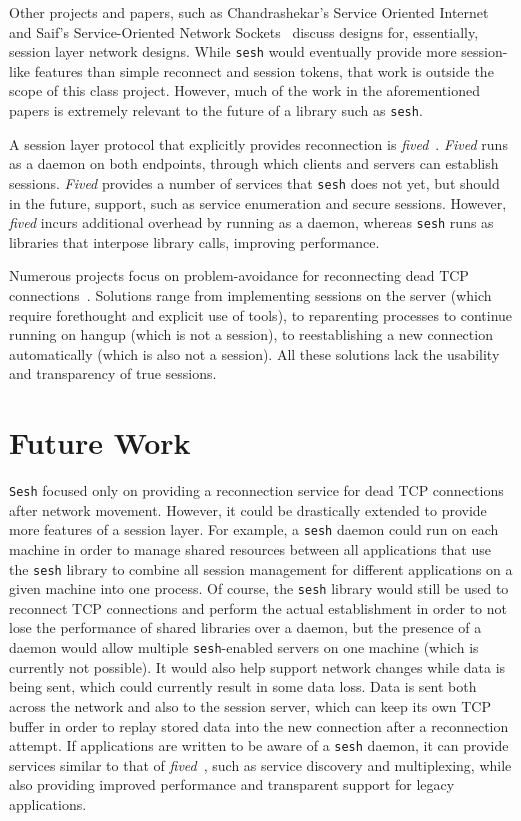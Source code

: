 \documentclass[twocolumn,11pt]{article}
\newcommand{\sesh}{\texttt{sesh}\xspace}
\newcommand{\Sesh}{\texttt{Sesh}\xspace}
\begin{document}
Other projects and papers, such as Chandrashekar's Service Oriented
Internet~\cite{chandrashekar2003service} and Saif's Service-Oriented Network
Sockets~\cite{Saif} discuss designs for, essentially, session layer network designs.
While \sesh would eventually provide more session-like features than
simple reconnect and session tokens, that work is outside the scope of this class
project. However, much of the work in the aforementioned papers is extremely
relevant to the future of a library such as \sesh.

A session layer protocol that explicitly provides reconnection is
\textit{fived}~\cite{wasptr-15-01}. \textit{Fived} runs as a daemon on both
endpoints, through which clients and servers can establish sessions.
\textit{Fived} provides a number of services that \sesh does not yet,
but should in the future, support, such as service enumeration and secure
sessions. However,
\textit{fived} incurs additional overhead by running as a daemon, whereas
\sesh runs as libraries that interpose library calls, improving
performance.

Numerous projects focus on problem-avoidance for reconnecting dead TCP
connections~\cite{mosh,autossh,screen,tmux}. Solutions range from implementing
sessions on the server (which require forethought and explicit use of tools), to
reparenting processes to continue running on hangup (which is not a session), to
reestablishing a new connection automatically (which is also not a session). All
these solutions lack the usability and transparency of true sessions.

\section{Future Work}

\Sesh focused only on providing a reconnection service for dead TCP connections
after network movement. However, it could be drastically extended to provide
more features of a session layer. For example, a \sesh daemon could run on each
machine in order to manage shared resources between all applications that use
the \sesh library to combine all session management for different applications
on a given machine into one process. Of course, the \sesh library would still be
used to reconnect TCP connections and perform the actual establishment in order
to not lose the performance of shared libraries over a daemon, but the presence
of a daemon would allow multiple \sesh-enabled servers on one machine (which is
currently not possible). It would also help support network changes while data
is being sent, which could currently result in some data loss. Data is sent both
across the network and also to the session server, which can keep its own TCP
buffer in order to replay stored data into the new connection after a
reconnection attempt. If applications are written to be aware of a \sesh daemon,
it can provide services similar to that of \textit{fived}~\cite{wasptr-15-01},
such as service discovery and multiplexing,
while also providing improved performance and transparent support for legacy
applications.
\end{document}
